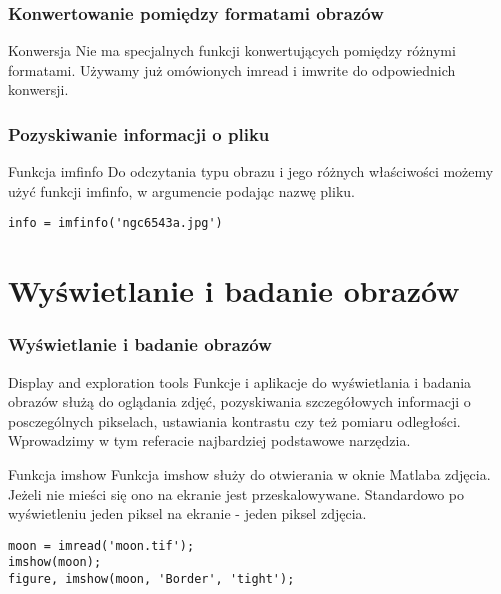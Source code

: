 \documentclass{beamer}
\begin{document}
\begin{frame}[fragile]
\frametitle{Konwertowanie pomiędzy formatami obrazów}
\begin{block}{Konwersja}
Nie ma specjalnych funkcji konwertujących pomiędzy różnymi formatami. Używamy już omówionych imread i imwrite do odpowiednich konwersji.
\end{block}
\end{frame}

\begin{frame}[fragile]
\frametitle{Pozyskiwanie informacji o pliku}
\begin{block}{Funkcja imfinfo}
Do odczytania typu obrazu i jego różnych właściwości możemy użyć funkcji imfinfo, w argumencie podając nazwę pliku.
\end{block}

\begin{example}
\begin{lstlisting}
info = imfinfo('ngc6543a.jpg')
\end{lstlisting}
\end{example}
\end{frame}

\section{Wyświetlanie i badanie obrazów}

\begin{frame}[fragile]
\frametitle{Wyświetlanie i badanie obrazów}
\begin{block}{Display and exploration tools}
Funkcje i aplikacje do wyświetlania i badania obrazów służą do oglądania zdjęć, pozyskiwania szczegółowych informacji o posczególnych pikselach, ustawiania kontrastu czy też pomiaru odległości. Wprowadzimy w tym referacie najbardziej podstawowe narzędzia.
\end{block}

\begin{block}{Funkcja imshow}
Funkcja imshow służy do otwierania w oknie Matlaba zdjęcia. Jeżeli nie mieści się ono na ekranie jest przeskalowywane. Standardowo po wyświetleniu jeden piksel na ekranie - jeden piksel zdjęcia.
\end{block}

\begin{example}
\begin{lstlisting}
moon = imread('moon.tif');
imshow(moon);
figure, imshow(moon, 'Border', 'tight');
\end{lstlisting}
\end{example}
\end{frame}
\end{document}
